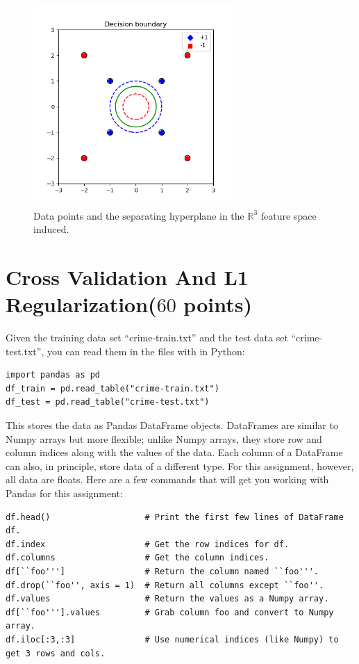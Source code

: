 \documentclass[10pt]{article}
\begin{document}
\begin{figure}[h!]
	\centering
	\includegraphics[width=3in]{1-1.png}
	\caption{Data points and the separating hyperplane in the $\mathbb{R}^3$ feature space induced.}
	\label{fig:svm_sol}
\end{figure}	
\newpage


\section{Cross Validation And L1 Regularization($60$ points)}
Given the training data set ``crime-train.txt''  and the test data set ``crime-test.txt'', you can read them in the files with in Python:
\begin{verbatim}
import pandas as pd
df_train = pd.read_table("crime-train.txt")
df_test = pd.read_table("crime-test.txt")
\end{verbatim}
This stores the data as Pandas DataFrame objects. DataFrames are similar to Numpy arrays but more flexible; unlike Numpy arrays, they store row and column indices along with the values of the data. Each column of a DataFrame can also, in principle, store data of a different type. For this assignment, however, all data are floats. Here are a few commands that will get you working with Pandas for this assignment:

\begin{verbatim}
df.head()                   # Print the first few lines of DataFrame df.
df.index                    # Get the row indices for df.
df.columns                  # Get the column indices.
df[``foo''']                # Return the column named ``foo'''.
df.drop(``foo'', axis = 1)  # Return all columns except ``foo''.
df.values                   # Return the values as a Numpy array.
df[``foo'''].values         # Grab column foo and convert to Numpy array.
df.iloc[:3,:3]              # Use numerical indices (like Numpy) to get 3 rows and cols.
\end{verbatim}
\end{document}
